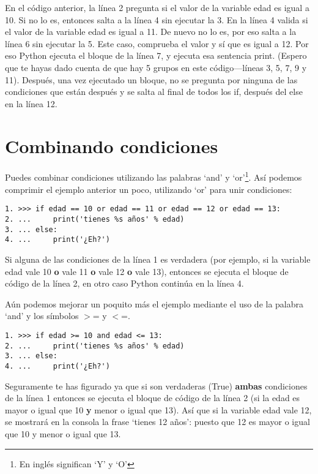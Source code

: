 En el código anterior, la línea 2 pregunta si el valor de la variable edad es igual a 10.  Si no lo es, entonces salta a la línea 4 sin ejecutar la 3. En la línea 4 valida si el valor de la variable edad es igual a 11. De nuevo no lo es, por eso salta a la línea 6 sin ejecutar la 5.  Este caso, comprueba el valor y sí que es igual a 12.  Por eso Python ejecuta el bloque de la línea 7, y ejecuta esa sentencia print.  (Espero que te hayas dado cuenta de que hay 5 grupos en este código---líneas 3, 5, 7, 9 y 11).  Después, una vez ejecutado un bloque, no se pregunta por ninguna de las condiciones que están después y se salta al final de todos los if, después del else en la línea 12.

\section{Combinando condiciones}
Puedes combinar condiciones utilizando las palabras `and' y `or'\footnote{En inglés significan `Y' y `O'}. Así podemos comprimir el ejemplo anterior un poco, utilizando `or' para unir condiciones:

\begin{listing}
\begin{verbatim}
1. >>> if edad == 10 or edad == 11 or edad == 12 or edad == 13:
2. ...     print('tienes %s años' % edad)
3. ... else:
4. ...     print('¿Eh?')
\end{verbatim}
\end{listing}

Si alguna de las condiciones de la línea 1 es verdadera (por ejemplo, si la variable edad vale 10 \textbf{o} vale 11 \textbf{o} vale 12 \textbf{o} vale 13), entonces se ejecuta el bloque de código de la línea 2, en otro caso Python continúa en la línea 4.  

Aún podemos mejorar un poquito más el ejemplo mediante el uso de la palabra `and' y los símbolos $>$= y $<$=.

\begin{listing}
\begin{verbatim}
1. >>> if edad >= 10 and edad <= 13:
2. ...     print('tienes %s años' % edad)
3. ... else:
4. ...     print('¿Eh?')
\end{verbatim}
\end{listing}

Seguramente te has figurado ya que si son verdaderas (True) \textbf{ambas} condiciones de la línea 1 entonces se ejecuta el bloque de código de la línea 2 (si la edad es mayor o igual que 10 \textbf{y} menor o igual que 13). Así que si la variable edad vale 12, se mostrará en la consola la frase `tienes 12 años': puesto que 12 es mayor o igual que 10 y menor o igual que 13.  

